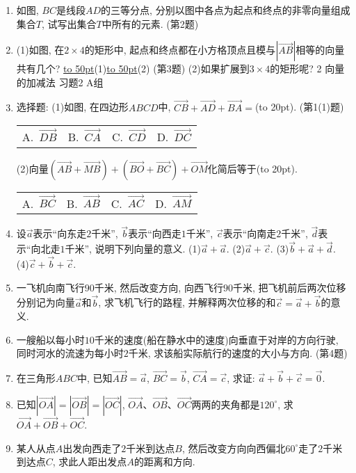 \documentclass[10pt,a4paper]{article}
\newcommand{\blank}[1]{\underline{\hbox to #1pt{}}}
\newcommand{\bracket}[1]{(\hbox to #1pt{})}
\newcommand{\fourch}[4]{\par\begin{tabular}{p{.23\textwidth}p{.23\textwidth}p{.23\textwidth}p{.23\textwidth}}
A.~#1 &B.~#2& C.~#3& D.~#4
\end{tabular}}
\begin{document}
\begin{enumerate}[1.]
(第1题)
(1)写出与$\overrightarrow{AD}$相等的向量.
(2)写出$\overrightarrow{DE}$的负向量.
(3)与$\overrightarrow{FE}$平行的非零向量共有几个?
\item 如图, $BC$是线段$AD$的三等分点, 分别以图中各点为起点和终点的非零向量组成集合$T$, 试写出集合$T$中所有的元素.
(第2题)
\item (1)如图, 在$2\times 4$的矩形中, 起点和终点都在小方格顶点且模与$|\overrightarrow{AB}|$相等的向量共有几个?
\blank{50}(1)\blank{50}(2)
(第3题)
(2)如果扩展到$3\times 4$的矩形呢?
2  向量的加减法
习题2  A组
\item 选择题:
(1)如图, 在四边形$ABCD$中, $\overrightarrow{CB}+\overrightarrow{AD}+\overrightarrow{BA}=$\bracket{20}.
(第1(1)题)
\fourch{$\overrightarrow{DB}$}{$\overrightarrow{CA}$}{$\overrightarrow{CD}$}{$\overrightarrow{DC}$}
(2)向量$(\overrightarrow{AB}+\overrightarrow{MB})+(\overrightarrow{BO}+\overrightarrow{BC})+\overrightarrow{OM}$化简后等于\bracket{20}.
\fourch{$\overrightarrow{BC}$}{$\overrightarrow{AB}$}{$\overrightarrow{AC}$}{$\overrightarrow{AM}$}
\item 设$\overrightarrow a$表示``向东走$2$千米'', $\overrightarrow b$表示``向西走$1$千米'', $\overrightarrow c$表示``向南走$2$千米'', $\overrightarrow d$表示``向北走$1$千米'', 说明下列向量的意义.
(1)$\overrightarrow a+\overrightarrow a$. (2)$\overrightarrow a+\overrightarrow c$.
(3)$\overrightarrow b+\overrightarrow a+\overrightarrow d$. (4)$\overrightarrow c+\overrightarrow b+\overrightarrow c$.
\item 一飞机向南飞行$90$千米, 然后改变方向, 向西飞行$90$千米, 把飞机前后两次位移分别记为向量$\overrightarrow a$和$\overrightarrow b$, 求飞机飞行的路程, 并解释两次位移的和$\overrightarrow c=\overrightarrow a+\overrightarrow b$的意义.
\item 一艘船以每小时$10$千米的速度(船在静水中的速度)向垂直于对岸的方向行驶, 同时河水的流速为每小时$2$千米, 求该船实际航行的速度的大小与方向.
(第4题)
\item 在三角形$ABC$中, 已知$\overrightarrow{AB}=\overrightarrow a$, $\overrightarrow{BC}=\overrightarrow b$, $\overrightarrow{CA}=\overrightarrow c$, 求证: $\overrightarrow a+\overrightarrow b+\overrightarrow c=\overrightarrow 0$.
\item 已知$|\overrightarrow{OA}|=|\overrightarrow{OB}|=|\overrightarrow{OC}|$, $\overrightarrow{OA}$、$\overrightarrow{OB}$、$\overrightarrow{OC}$两两的夹角都是$120^{\circ }$, 求$\overrightarrow{OA}+\overrightarrow{OB}+\overrightarrow{OC}$.
\item 某人从点$A$出发向西走了$2$千米到达点$B$, 然后改变方向向西偏北$60^{\circ }$走了$2$千米到达点$C$, 求此人距出发点$A$的距离和方向.

\end{enumerate}
\end{document}
